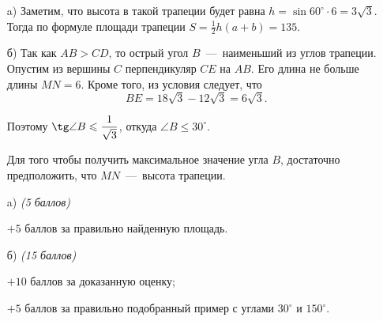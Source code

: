 \solutionSection
\begin{enumerate}
    \item[a)] Заметим, что высота в такой трапеции
        будет равна $h = \sin{60^\circ} \cdot 6 = 3\sqrt{3}$. Тогда по
        формуле площади трапеции $S = \frac{1}{2}h(a+b) = 135$.
        
    \item[б)] Так как $AB > CD$, то острый угол $B$~---~наименьший из углов трапеции.
        Опустим из вершины $C$ перпендикуляр $CE$ на $AB$. Его длина не больше длины $MN = 6$.
        Кроме того, из условия следует, что 
        $$BE = 18\sqrt{3} - 12\sqrt{3} = 6\sqrt{3}.$$
        
        Поэтому $\tg\angle B \leqslant \dfrac{1}{\sqrt{3}}$, откуда $\angle B \leqslant 30^\circ$.	

        Для того чтобы получить максимальное значение угла $B$, достаточно предположить, что $MN$~---~высота трапеции.   
\end{enumerate}


\additionalCriteria

\begin{enumerate}
    \item[a)] \textit{(5 баллов)} 

	$+5$ баллов за правильно найденную площадь.

	\item[б)] \textit{(15 баллов)} 
	
	$+10$ баллов за доказанную оценку;
	
	$+5$ баллов за правильно подобранный пример с углами $30^{\circ}$ и $150^{\circ}$.
\end{enumerate}	
